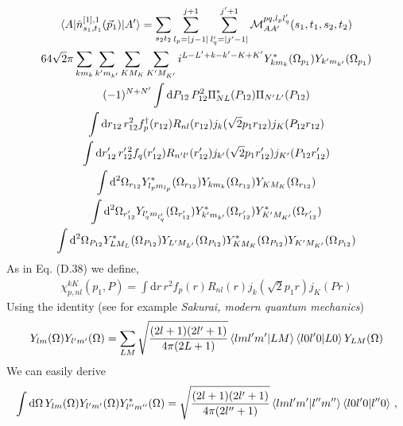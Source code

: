 \documentclass[10pt]{article}
\begin{document}
\begin{multline*}
\braket{ A | \hat{n}^{[1],1}_{s_1,t_1}(\vec{p}_1) | A'} = \sum_{s_2 t_2}  
\sum_{l_p = |j-1|}^{j+1} \sum_{l_q' = |j' - 1|}^{j'+1} \mathcal{M}_{AA'}^{p 
q,l_p l_q'}(s_1,t_1,s_2,t_2) \\
64 \sqrt{2} \pi \sum_{k m_k} \sum_{k' m_{k'}} \sum_{K M_K} \sum_{K' M_{K'}} 
i^{L-L'+k-k'-K+K'} Y_{k m_k}^{*}(\Omega_{p_1}) Y_{k' m_{k'}}(\Omega_{p_1}) \\
 (-1)^{N+N'}\int \text{d} P_{12} \, P_{12}^{2} \Pi_{N L}^{*}(P_{12}) \Pi_{N' 
L'}(P_{12})\\
 \int \text{d} r_{12}\, r_{12}^{2} f_{p}^{\dagger}(r_{12}) R_{n l}(r_{12}) 
j_{k}( \sqrt{2} p_1 r_{12})  j_{K}(P_{12} r_{12}) \\
\int \text{d} r_{12}' \, r_{12}^{\prime \, 2} f_{q}(r_{12}')  R_{n' 
l'}(r_{12}') j_{k'}( \sqrt{2} p_1 r_{12}')  j_{K'}(P_{12} r_{12}') \\
 \int \text{d}^{2} \Omega_{r_{12}}  Y_{l_p m_{l_p} }^{*}(\Omega_{r_{12}}) Y_{k 
m_k}(\Omega_{r_{12}}) Y_{K M_K}(\Omega_{r_{12}}) \\
 \int \text{d}^{2} \Omega_{r_{12}'}  Y_{ l_q' m_{l_q'} }(\Omega_{r_{12}'})  
Y_{k' m_{k'}}^{*}(\Omega_{r_{12}'}) Y_{K' M_{K'}}^{*}(\Omega_{r_{12}'}) \\
   \int \text{d}^{2} \Omega_{P_{12}}  Y_{L M_L}^{*}(\Omega_{P_{12}})  Y_{L' 
M_{L'}}(\Omega_{P_{12}}) Y_{K M_K}^{*}(\Omega_{P_{12}}) Y_{K' 
M_{K'}}(\Omega_{P_{12}})
\end{multline*}
As in Eq. (D.38) we define,
\begin{align}\label{eq:chi}
	\chi_{p,nl}^{kK}(p_1,P) = \int \text{d} r\, r^{2} f_{p}(r) R_{n l}(r) 
j_{k}( \sqrt{2} p_1 r)  j_{K}(P r)
\end{align}
Using the identity (see for example \textit{Sakurai, modern quantum mechanics})
\begin{align*}
	Y_{ l m }(\Omega) Y_{ l' m'}(\Omega) = \sum_{LM} \sqrt{ 
\frac{(2l+1)(2l'+1)}{4 \pi (2L+1)}} \braket{ l m l' m' | L M} \braket{ l 0 l' 0 
| L 0 } Y_{L M}(\Omega)
\end{align*}
We can easily derive
\begin{align*}
	\int \text{d} \Omega \, Y_{ l m }(\Omega) Y_{ l' m'}(\Omega) Y_{ l'' 
m''}^{*}(\Omega) = \sqrt{ \frac{(2l+1)(2l'+1)}{4 \pi (2l''+1)}} \braket{ l m l' 
m' | l'' m''} \braket{ l 0 l' 0 | l'' 0 } \, ,
\end{align*}
\end{document}
